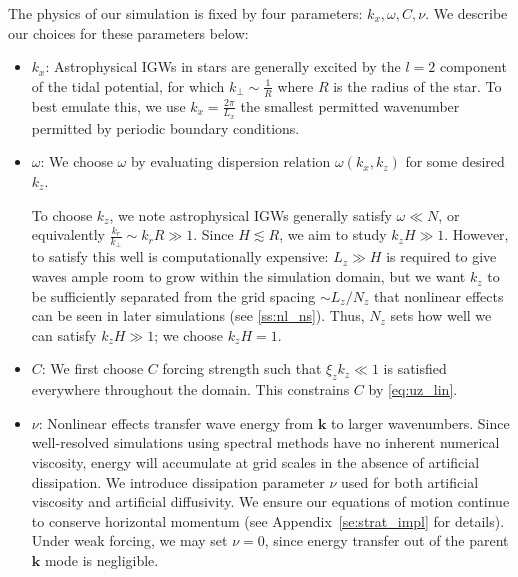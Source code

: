 \documentclass[
        fleqn,
        usenatbib,
    ]{mnras}
\newcommand*{\p}[1]{\left(#1\right)}
\newcommand*{\bm}[1]{\boldsymbol{\mathbf{#1}}}
\begin{document}
The physics of our simulation is fixed by four parameters: $k_{x}, \omega, C,
\nu$. We describe our choices for these parameters below:
\begin{itemize}
    \item $k_{x}$: Astrophysical IGWs in stars are generally excited by the $l
        = 2$ component of the tidal potential, for which $k_{\perp} \sim
        \frac{1}{R}$ where $R$ is the radius of the star. To best emulate this,
        we use $k_{x} = \frac{2\pi}{L_x}$ the smallest permitted wavenumber
        permitted by periodic boundary conditions.

    \item $\omega$: We choose $\omega$ by evaluating dispersion relation
        $\omega\p{k_{x}, k_{z}}$ for some desired $k_{z}$.

        To choose $k_z$, we note astrophysical IGWs generally satisfy $\omega
        \ll N$, or equivalently $\frac{k_r}{k_{\perp}} \sim k_rR \gg 1$. Since
        $H \lesssim R$, we aim to study $k_{z}H \gg 1$. However, to satisfy this
        well is computationally expensive: $L_z \gg H$ is required to give waves
        ample room to grow within the simulation domain, but we want $k_{z}$ to
        be sufficiently separated from the grid spacing $\sim L_z / N_z$ that
        nonlinear effects can be seen in later simulations (see
        \autoref{ss:nl_ns}). Thus, $N_z$ sets how well we can satisfy $k_{z}H
        \gg 1$; we choose $k_{z}H = 1$.

    \item $C$: We first choose $C$ forcing strength such that $\xi_z k_z \ll 1$
        is satisfied everywhere throughout the domain. This constrains $C$ by
        \autoref{eq:uz_lin}.

    \item $\nu$: Nonlinear effects transfer wave energy from $\bm{k}$ to
        larger wavenumbers. Since well-resolved simulations using spectral
        methods have no inherent numerical viscosity, energy will accumulate at
        grid scales in the absence of artificial dissipation. We introduce
        dissipation parameter $\nu$ used for both artificial viscosity and
        artificial diffusivity. We ensure our equations of motion continue to
        conserve horizontal momentum (see Appendix~\ref{se:strat_impl} for
        details). Under weak forcing, we may set $\nu = 0$, since energy
        transfer out of the parent $\bm{k}$ mode is negligible.
\end{itemize}
\end{document}
